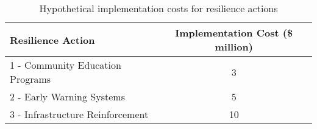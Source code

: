 \begin{table}[H]
    \centering
    \caption{Hypothetical implementation costs for resilience actions}
    \label{table:implementation_costs}
    \begin{tabular}{lc}
        \hline
        \textbf{Resilience Action} & \textbf{Implementation Cost} (\$ million) \\
        \hline
        1 - Community Education Programs & 3 \\
        2 - Early Warning Systems & 5 \\
        3 - Infrastructure Reinforcement & 10 \\
        \hline
    \end{tabular}
\end{table}
